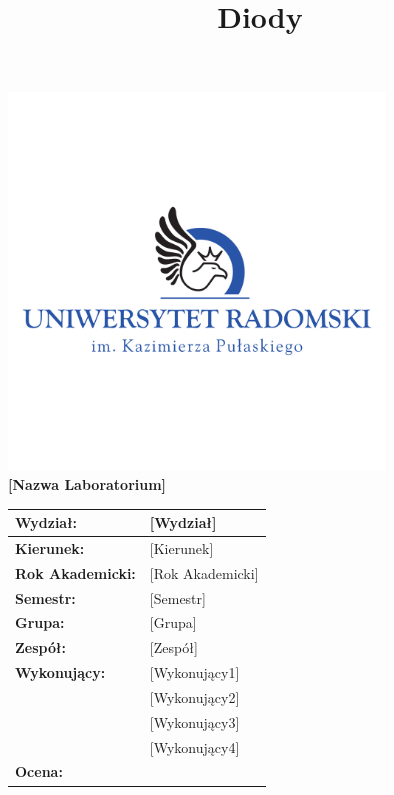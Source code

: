\documentclass[11pt]{article}
\title{Diody}
\date{}
\begin{document}
\thispagestyle{empty} %

\begin{center}
    \includegraphics[width=10cm,page=1, trim=40 0 0 0]{logaUR.pdf} \\
    {\large\textbf{[Nazwa Laboratorium]}} \\
\end{center}

\vspace{0.5cm}

\begin{center}
\end{center}

\vspace{1.5cm}

\begin{center}
\begin{tabular}{|>{\bfseries}p{4cm}|p{6cm}|}
\hline
Wydział: & [Wydział] \\
\hline
Kierunek: & [Kierunek] \\
\hline
Rok Akademicki: & [Rok Akademicki] \\
\hline
Semestr: & [Semestr] \\
\hline
Grupa: & [Grupa] \\
\hline
Zespół: & [Zespół] \\
\hline
Wykonujący: & [Wykonujący1] \\
& [Wykonujący2] \\
& [Wykonujący3] \\
& [Wykonujący4] \\
\hline
Ocena: &  \\
\hline
\end{tabular}
\end{center}
\end{document}
